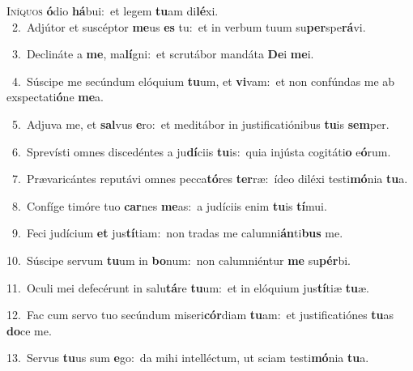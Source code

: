\lettrine{\initial\textcolor{\initialcolor}{I}}{níquos} \textbf{ó}\-dio \textbf{há}\-bui:~\star et legem \textbf{tu}\-am di\-\textbf{lé}\-xi.\\
{\numbfont\textcolor{\numbcolor}{~2.}}~Adjútor et suscéptor \textbf{me}\-us \textbf{es} tu:~\star et in verbum tuum su\-\textbf{per}\-spe\-\textbf{rá}\-vi.\par
{\numbfont\textcolor{\numbcolor}{~3.}}~Declináte a \textbf{me}\-, ma\-\textbf{lí}\-gni:~\star et scrutábor mandáta \textbf{De}\-i \textbf{me}\-i.\par
{\numbfont\textcolor{\numbcolor}{~4.}}~Súscipe me secúndum elóquium \textbf{tu}\-um, et \textbf{vi}\-vam:~\star et non confúndas me ab exspectati\-\textbf{ó}\-ne \textbf{me}\-a.\par
{\numbfont\textcolor{\numbcolor}{~5.}}~Adjuva me, et \textbf{sal}\-vus \textbf{e}\-ro:~\star et meditábor in justificatiónibus \textbf{tu}\-is \textbf{sem}\-per.\par
{\numbfont\textcolor{\numbcolor}{~6.}}~Sprevísti omnes discedéntes a ju\-\textbf{dí}\-ciis \textbf{tu}\-is:~\star quia injústa cogitáti\textbf{o} e\-\textbf{ó}\-rum.\par
{\numbfont\textcolor{\numbcolor}{~7.}}~Prævaricántes reputávi omnes pecca\-\textbf{tó}\-res \textbf{ter}\-ræ:~\star ídeo diléxi testi\-\textbf{mó}\-nia \textbf{tu}\-a.\par
{\numbfont\textcolor{\numbcolor}{~8.}}~Confíge timóre tuo \textbf{car}\-nes \textbf{me}\-as:~\star a judíciis enim \textbf{tu}\-is \textbf{tí}\-mui.\par
{\numbfont\textcolor{\numbcolor}{~9.}}~Feci judícium \textbf{et} jus\-\textbf{tí}\-tiam:~\star non tradas me calumni\-\textbf{án}\-ti\textbf{bus} me.\par
{\numbfont\textcolor{\numbcolor}{10.}}~Súscipe servum \textbf{tu}\-um in \textbf{bo}\-num:~\star non calumniéntur \textbf{me} su\-\textbf{pér}\-bi.\par
{\numbfont\textcolor{\numbcolor}{11.}}~Oculi mei defecérunt in salu\-\textbf{tá}\-re \textbf{tu}\-um:~\star et in elóquium jus\-\textbf{tí}\-tiæ \textbf{tu}\-æ.\par
{\numbfont\textcolor{\numbcolor}{12.}}~Fac cum servo tuo secúndum miseri\-\textbf{cór}\-diam \textbf{tu}\-am:~\star et justificatiónes \textbf{tu}\-as \textbf{do}\-ce me.\par
{\numbfont\textcolor{\numbcolor}{13.}}~Servus \textbf{tu}\-us sum \textbf{e}\-go:~\star da mihi intelléctum, ut sciam testi\-\textbf{mó}\-nia \textbf{tu}\-a.\par
